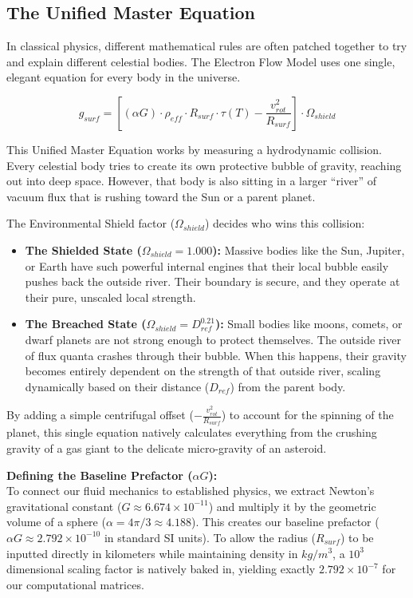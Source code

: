 \documentclass[11pt, a4paper]{article}
\begin{document}
\subsection{The Unified Master Equation}
  In classical physics, different mathematical rules are often patched together to try and explain different celestial bodies. The Electron Flow Model uses one single, elegant equation for every body in the universe.

  \begin{equation}
    g_{surf} = \left[ (\alpha G) \cdot \rho_{eff} \cdot R_{surf} \cdot \tau(T) - \frac{v_{rot}^2}{R_{surf}} \right] \cdot \Omega_{shield}
  \end{equation}

  This Unified Master Equation works by measuring a hydrodynamic collision. Every celestial body tries to create its own protective bubble of gravity, reaching out into deep space. However, that body is also sitting in a larger ``river'' of vacuum flux that is rushing toward the Sun or a parent planet. 
  
  The Environmental Shield factor ($\Omega_{shield}$) decides who wins this collision:
  \begin{itemize}
    \item \textbf{The Shielded State ($\Omega_{shield} = 1.000$):} Massive bodies like the Sun, Jupiter, or Earth have such powerful internal engines that their local bubble easily pushes back the outside river. Their boundary is secure, and they operate at their pure, unscaled local strength.
    \item \textbf{The Breached State ($\Omega_{shield} = D_{ref}^{0.21}$):} Small bodies like moons, comets, or dwarf planets are not strong enough to protect themselves. The outside river of flux quanta crashes through their bubble. When this happens, their gravity becomes entirely dependent on the strength of that outside river, scaling dynamically based on their distance ($D_{ref}$) from the parent body.
  \end{itemize}

  By adding a simple centrifugal offset ($-\frac{v_{rot}^2}{R_{surf}}$) to account for the spinning of the planet, this single equation natively calculates everything from the crushing gravity of a gas giant to the delicate micro-gravity of an asteroid. 
  
  \textbf{Defining the Baseline Prefactor ($\alpha G$):} \\
  To connect our fluid mechanics to established physics, we extract Newton's gravitational constant ($G \approx 6.674 \times 10^{-11}$) and multiply it by the geometric volume of a sphere ($\alpha = 4\pi/3 \approx 4.188$). This creates our baseline prefactor ($\alpha G \approx 2.792 \times 10^{-10}$ in standard SI units). To allow the radius ($R_{surf}$) to be inputted directly in kilometers while maintaining density in $kg/m^3$, a $10^3$ dimensional scaling factor is natively baked in, yielding exactly $2.792 \times 10^{-7}$ for our computational matrices. 
  
\end{document}
